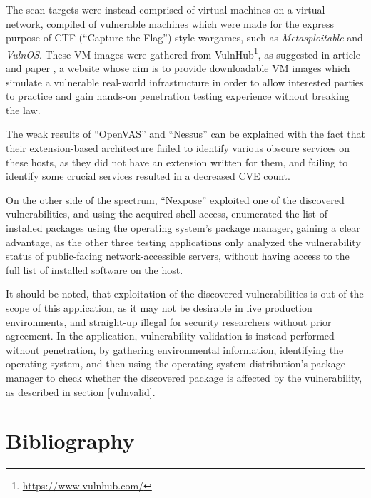 \documentclass[a4paper,12pt]{article}
\begin{document}
	The scan targets were instead comprised of virtual machines on a virtual network, compiled of vulnerable machines which were made for the express purpose of CTF (``Capture the Flag'') style wargames, such as \textit{Metasploitable} and \textit{VulnOS}. These VM images were gathered from VulnHub\footnote{\url{https://www.vulnhub.com/}}, as suggested in article \cite{penintro15} and paper \cite{secgen15}, a website whose aim is to provide downloadable VM images which simulate a vulnerable real-world infrastructure in order to allow interested parties to practice and gain hands-on penetration testing experience without breaking the law.
	
	The weak results of ``OpenVAS'' and ``Nessus'' can be explained with the fact that their extension-based architecture failed to identify various obscure services on these hosts, as they did not have an extension written for them, and failing to identify some crucial services resulted in a decreased CVE count.
	
	On the other side of the spectrum, ``Nexpose'' exploited one of the discovered vulnerabilities, and using the acquired shell access, enumerated the list of installed packages using the operating system's package manager, gaining a clear advantage, as the other three testing applications only analyzed the vulnerability status of public-facing network-accessible servers, without having access to the full list of installed software on the host.
	
	It should be noted, that exploitation of the discovered vulnerabilities is out of the scope of this application, as it may not be desirable in live production environments, and straight-up illegal for security researchers without prior agreement. In the application, vulnerability validation is instead performed without penetration, by gathering environmental information, identifying the operating system, and then using the operating system distribution's package manager to check whether the discovered package is affected by the vulnerability, as described in section \ref{vulnvalid}.

\newpage
\section{Bibliography}
 

	\begingroup
	\renewcommand{\section}[2]{}
	\renewcommand{\markboth}[2]{}
		
		
	\endgroup
\end{document}
